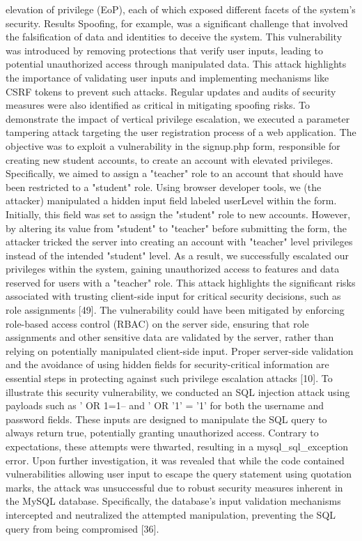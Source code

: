 \documentclass[letterpaper,twocolumn]{article}
\begin{document}
elevation of privilege (EoP), each of which exposed different facets of the system’s security.
Results
Spoofing, for example, was a significant challenge that involved the falsification of data and identities to deceive the system. This vulnerability was introduced by removing protections that verify user inputs, leading to potential unauthorized access through manipulated data. This attack highlights the importance of validating user inputs and implementing mechanisms like CSRF tokens to prevent such attacks. Regular updates and audits of security measures were also identified as critical in mitigating spoofing risks.
To demonstrate the impact of vertical privilege escalation, we executed a parameter tampering attack targeting the user registration process of a web application. The objective was to exploit a vulnerability in the signup.php form, responsible for creating new student accounts, to create an account with elevated privileges. Specifically, we aimed to assign a "teacher" role to an account that should have been restricted to a "student" role.
Using browser developer tools, we (the attacker) manipulated a hidden input field labeled userLevel within the form. Initially, this field was set to assign the "student" role to new accounts. However, by altering its value from "student" to "teacher" before submitting the form, the attacker tricked the server into creating an account with "teacher" level privileges instead of the intended "student" level. As a result, we successfully escalated our privileges within the system, gaining unauthorized access to features and data reserved for users with a "teacher" role.
This attack highlights the significant risks associated with trusting client-side input for critical security decisions, such as role assignments [49]. The vulnerability could have been mitigated by enforcing role-based access control (RBAC) on the server side, ensuring that role assignments and other sensitive data are validated by the server, rather than relying on potentially manipulated client-side input. Proper server-side validation and the avoidance of using hidden fields for security-critical information are essential steps in protecting against such privilege escalation attacks [10].
To illustrate this security vulnerability, we conducted an SQL injection attack using payloads such as {' OR 1=1--} and {' OR '1' = '1'} for both the username and password fields. These inputs are designed to manipulate the SQL query to always return true, potentially granting unauthorized access. Contrary to expectations, these attempts were thwarted, resulting in a mysql_sql_exception error. Upon further investigation, it was revealed that while the code contained vulnerabilities allowing user input to escape the query statement using quotation marks, the attack was unsuccessful due to robust security measures inherent in the MySQL database. Specifically, the database’s input validation mechanisms intercepted and neutralized the attempted manipulation, preventing the SQL query from being compromised [36].
\end{document}
